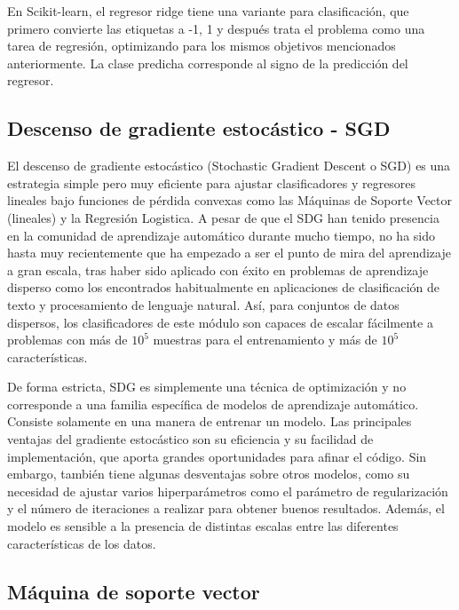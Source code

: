 
En Scikit-learn, el regresor ridge tiene una variante para clasificación, que primero convierte las etiquetas a {-1, 1} y después trata el problema como una tarea de regresión, optimizando para los mismos objetivos mencionados anteriormente. La clase predicha corresponde al signo de la predicción del regresor.

\subsection{Descenso de gradiente estocástico - SGD}


El descenso de gradiente estocástico (Stochastic Gradient Descent o SGD) es una estrategia simple pero muy eficiente para ajustar clasificadores y regresores lineales bajo funciones de pérdida convexas como las Máquinas de Soporte Vector (lineales) y la Regresión Logistica.
A pesar de que el SDG han tenido presencia en la comunidad de aprendizaje automático durante mucho tiempo,
no ha sido hasta muy recientemente que ha empezado a ser el punto de mira del aprendizaje a gran escala,
tras haber sido aplicado con éxito en problemas de aprendizaje disperso como los encontrados habitualmente en aplicaciones de clasificación de texto y procesamiento de lenguaje natural.
Así, para conjuntos de datos dispersos,
los clasificadores de este módulo son capaces de escalar fácilmente a problemas con más de $10^{5}$ muestras para el entrenamiento y más de $10^{5}$ características.

De forma estricta, SDG es simplemente una técnica de optimización y no corresponde a una familia específica de modelos de aprendizaje automático. 
Consiste solamente en una manera de entrenar un modelo.
Las principales ventajas del gradiente estocástico son su eficiencia y su facilidad de implementación, que aporta grandes oportunidades para afinar el código.
Sin embargo, también tiene algunas desventajas sobre otros modelos, como su necesidad de ajustar varios hiperparámetros como el parámetro de regularización y el número de iteraciones a realizar para obtener buenos resultados.
Además, el modelo es sensible a la presencia de distintas escalas entre las diferentes características de los datos.

\subsection{Máquina de soporte vector}

